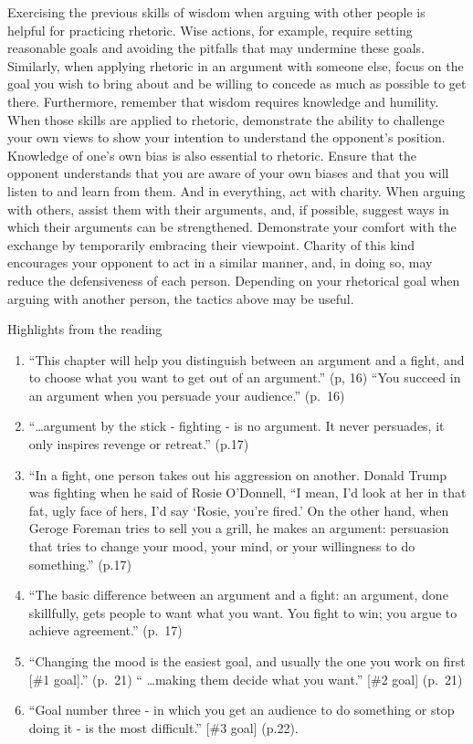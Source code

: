 \documentclass[
]{book}
\providecommand{\tightlist}{%
  \setlength{\itemsep}{0pt}\setlength{\parskip}{0pt}}
\begin{document}
Exercising the previous skills of wisdom when arguing with other people is helpful for practicing rhetoric. Wise actions, for example, require setting reasonable goals and avoiding the pitfalls that may undermine these goals. Similarly, when applying rhetoric in an argument with someone else, focus on the goal you wish to bring about and be willing to concede as much as possible to get there. Furthermore, remember that wisdom requires knowledge and humility. When those skills are applied to rhetoric, demonstrate the ability to challenge your own views to show your intention to understand the opponent's position. Knowledge of one's own bias is also essential to rhetoric. Ensure that the opponent understands that you are aware of your own biases and that you will listen to and learn from them. And in everything, act with charity. When arguing with others, assist them with their arguments, and, if possible, suggest ways in which their arguments can be strengthened. Demonstrate your comfort with the exchange by temporarily embracing their viewpoint. Charity of this kind encourages your opponent to act in a similar manner, and, in doing so, may reduce the defensiveness of each person. Depending on your rhetorical goal when arguing with another person, the tactics above may be useful.

Highlights from the reading

\begin{enumerate}
\def\labelenumi{\arabic{enumi}.}
\tightlist
\item
  ``This chapter will help you distinguish between an argument and a fight, and to choose what you want to get out of an argument.'' (p, 16) ``You succeed in an argument when you persuade your audience.'' (p.~16)\\
\item
  ``\ldots argument by the stick - fighting - is no argument. It never persuades, it only inspires revenge or retreat.'' (p.17)\\
\item
  ``In a fight, one person takes out his aggression on another. Donald Trump was fighting when he said of Rosie O'Donnell, ``I mean, I'd look at her in that fat, ugly face of hers, I'd say `Rosie, you're fired.' On the other hand, when Geroge Foreman tries to sell you a grill, he makes an argument: persuasion that tries to change your mood, your mind, or your willingness to do something.'' (p.17)\\
\item
  ``The basic difference between an argument and a fight: an argument, done skillfully, gets people to want what you want. You fight to win; you argue to achieve agreement.'' (p.~17)\\
\item
  ``Changing the mood is the easiest goal, and usually the one you work on first {[}\#1 goal{]}.'' (p.~21) `` \ldots making them decide what you want.'' {[}\#2 goal{]} (p.~21)\\
\item
  ``Goal number three - in which you get an audience to do something or stop doing it - is the most difficult.'' {[}\#3 goal{]} (p.22).
\end{enumerate}
\end{document}
